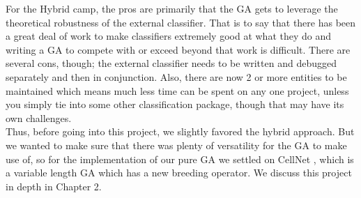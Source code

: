 For the Hybrid camp, the pros are primarily that the GA gets to leverage the theoretical robustness of the external classifier.  That is to say that there has been a great deal of work to make classifiers extremely good at what they do and writing a GA to compete with or exceed beyond that work is difficult.  There are several cons, though; the external classifier needs to be written and debugged separately and then in conjunction.  Also, there are now 2 or more entities to be maintained which means much less time can be spent on any one project, unless you simply tie into some other classification package, though that may have its own challenges.\\
Thus, before going into this project, we slightly favored the hybrid approach.  But we wanted to make sure that there was plenty of versatility for the GA to make use of, so for the implementation of our pure GA we settled on CellNet \citep{kharma_project_2004}, which is a variable length GA which has a new breeding operator.  We discuss this project in depth in Chapter 2.  

